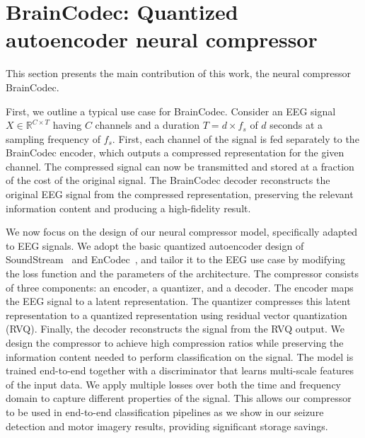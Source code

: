 \documentclass{article} %
\begin{document}
\section{BrainCodec: Quantized autoencoder neural compressor}

This section presents the main contribution of this work, the neural compressor BrainCodec. 

First, we outline a typical use case for BrainCodec. Consider an EEG signal $X \in \mathbb{R}^{C\times T}$ having $C$ channels and a duration $T = d\times f_s$ of $d$ seconds at a sampling frequency of $f_s$. First, each channel of the signal is fed separately to the BrainCodec encoder, which outputs a compressed representation for the given channel. 
The compressed signal can now be transmitted and stored at a fraction of the cost of the original signal. The BrainCodec decoder reconstructs the original EEG signal from the compressed representation, preserving the relevant information content and producing a high-fidelity result. %

We now focus on the design of our neural compressor model, specifically adapted to EEG signals. We adopt the basic quantized autoencoder design of SoundStream~\citep{Zeghidour2022} and EnCodec~\citep{Defossez2023}, and tailor it to the EEG use case by modifying the loss function and the parameters of the architecture. The compressor consists of three components: an encoder, a quantizer, and a decoder. The encoder maps the EEG signal to a latent representation. The quantizer compresses this latent representation to a quantized representation using residual vector quantization (RVQ). Finally, the decoder reconstructs the signal from the RVQ output. We design the compressor to achieve high compression ratios while preserving the information content needed to perform classification on the signal. The model is trained end-to-end together with a discriminator that learns multi-scale features of the input data. We apply multiple losses over both the time and frequency domain to capture different properties of the signal. This allows our compressor to be used in end-to-end classification pipelines as we show in our seizure detection and motor imagery results, providing significant storage savings. 
\end{document}
